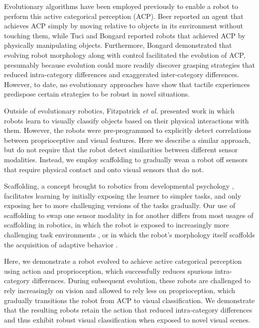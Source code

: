 \documentclass{sig-alternate}
\begin{document}
Evolutionary algorithms have been employed previously to enable a
robot to perform this active categorical perception (ACP).
Beer \cite{beer2003dynamics} reported an agent that achieves ACP simply
by moving relative to objects in its environment without
touching them, while
Tuci \cite{tuci2010active} and Bongard \cite{bongard2010utility} reported
robots that achieved
ACP by physically manipulating objects.
Furthermore, Bongard \cite{bongard2010utility}
demonstrated that evolving robot morphology along with control
facilitated the evolution of ACP, presumably because
evolution could more readily discover grasping strategies
that reduced intra-category differences and exaggerated
inter-category differences. 
However, to date, no evolutionary approaches have show that tactile experiences
predispose certain strategies to be robust in novel situations. 

Outside of evolutionary robotics, Fitzpatrick \textit{et al.}
\cite{fitzpatrick2003learning} presented work in which robots
learn to visually classify objects based on their physical
interactions with them. However, the robots were pre-programmed
to explicitly detect correlations between proprioceptive and visual
features. Here we describe a similar approach, but do not
require that the robot detect similarities between different
sensor modalities. Instead, we employ scaffolding to gradually
wean a robot off sensors that require physical contact and onto
visual sensors that do not.

Scaffolding, a concept brought to robotics from developmental psychology
\cite{Plumert96}, facilitates learning by initially exposing the learner
to simpler tasks, and only exposing her to more challenging
versions of the tasks gradually. Our use of scaffolding to
swap one sensor modality in for another differs from most
usages of scaffolding in robotics, in which the robot is exposed
to increasingly more challenging task environments
\cite{dorigo1994robot, perkins1996robot, saksida1997shaping},
or in which the robot's morphology itself scaffolds the acquisition
of adaptive behavior
\cite{bongard2011morphological, bongard2011morphologicalb}.

Here, we demonstrate
a robot evolved to achieve active categorical perception using
action and proprioception, which successfully reduces
spurious intra-category differences.
During subsequent evolution, these robots
are challenged to rely increasingly on vision
and allowed to rely less on proprioception, which gradually transitions
the robot from ACP to visual classification. We demonstrate
that the resulting robots retain the action that reduced
intra-category differences and thus exhibit robust visual classification
when exposed to novel visual scenes.
\end{document}

